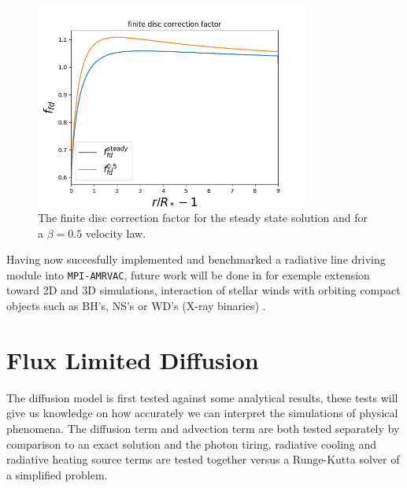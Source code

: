 %
%

\begin{figure}
\centering
\includegraphics[width = 0.8\textwidth]{CAK_fd_factor.png}
\caption{The finite disc correction factor for the steady state solution and for a $\beta = 0.5$ velocity law.}
\label{fig: fd_factor}
\end{figure}

Having now succesfully implemented and benchmarked a radiative line driving module into \texttt{MPI-AMRVAC}, future work will be done in for exemple extension toward 2D and 3D simulations,  interaction of stellar winds with orbiting compact objects such as BH's, NS's or WD's (X-ray binaries) \citep{Mellah2017}.


\section{Flux Limited Diffusion}
The diffusion model is first tested against some analytical results, these tests will give us knowledge on how accurately we can interpret the simulations of physical phenomena. The diffusion term and advection term are both tested separately by comparison to an exact solution and the photon tiring, radiative cooling and radiative heating source terms are tested together versus a Runge-Kutta solver of a simplified problem.

